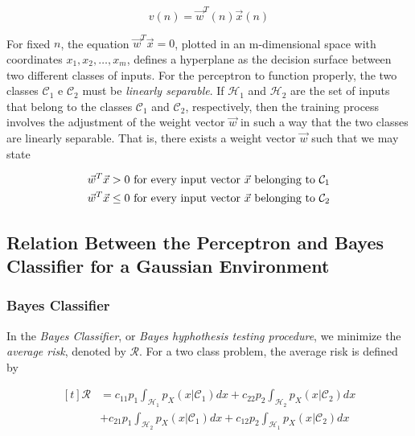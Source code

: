 \documentclass[twocolumn]{article}
\newcommand{\integral}{\displaystyle\int}
\begin{document}
	 $$
		 v(n) = \vec{w}^{T}(n) \vec{x} (n)
	 $$

	 For fixed $ n $, the equation $ \vec{w}^{T} \vec{x} = 0 $, plotted in an m-dimensional space with coordinates $ x_{1}, x_{2}, \ldots, x_{m} $, defines a hyperplane as the decision surface between two different classes of inputs. For the perceptron to function properly, the two classes $ \mathcal{C}_{1} $ e $ \mathcal{C}_{2} $ must be \textit{linearly separable}. If $ \mathcal{H}_{1} $ and $ \mathcal{H}_{2} $ are the set of inputs that belong to the classes $ \mathcal{C}_{1} $ and $ \mathcal{C}_{2} $, respectively, then the training process involves the adjustment of the weight vector $ \vec{w} $ in such a way that the two classes are linearly separable. That is, there exists a weight vector $ \vec{w} $ such that we may state

	 $$ \begin{aligned}[t]
			  & \vec{w}^{T} \vec{x} > 0 \text{ for every input vector $ \vec{x} $ belonging to $ \mathcal{C}_{1} $}         \\
			  & \vec{w}^{T} \vec{x} \leq 0 \text{ for every input vector } \vec{x} \text{ belonging to $ \mathcal{C}_{2} $} \\
		 \end{aligned} $$


 \subsection{Relation Between the Perceptron and Bayes Classifier for a Gaussian Environment}

	 \subsubsection{Bayes Classifier}

		 In the \textit{Bayes Classifier}, or \textit{Bayes hyphothesis testing procedure}, we minimize the \textit{average risk}, denoted by \( \mathcal{R} \). For a two class problem, the average risk is defined by

		 $$ \begin{aligned}[t]
				 \mathcal{R} & = c_{11}p_{1}\integral_{ \mathcal{H}_{1}}p_{X} (x | \mathcal{C}_{1})dx + c_{22}p_{2}\integral_{ \mathcal{H}_{2}}p_{X} (x | \mathcal{C}_{2})dx  \\
				             & + c_{21}p_{1}\integral_{ \mathcal{H}_{2}}p_{X} (x | \mathcal{C}_{1})dx + c_{12}p_{2}\integral_{ \mathcal{H}_{1}} p_{X} (x | \mathcal{C}_{2})dx \\
			 \end{aligned} $$
\end{document}
